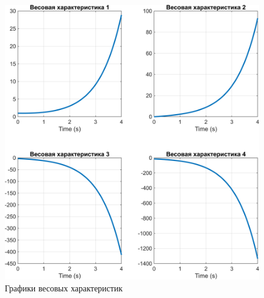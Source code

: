 \begin{figure}[H]
    \centering
    \includegraphics[width=\linewidth]{figs/1_ir.png}
    \caption{Графики весовых характеристик}
    \label{fig:1_ir}
\end{figure}

